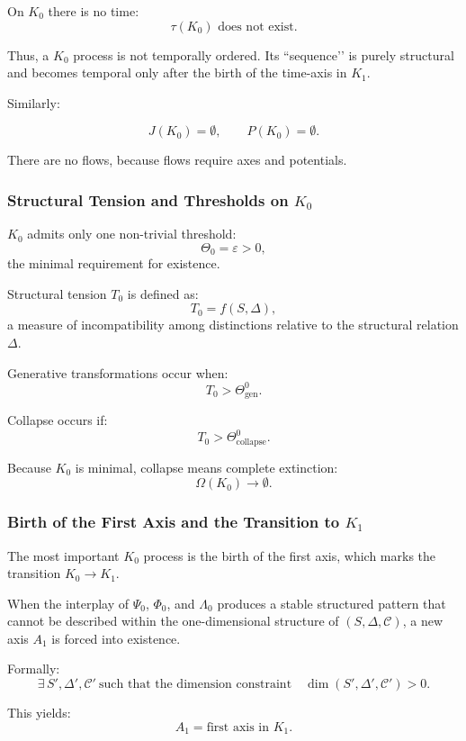 On $K_0$ there is no time:
\[
\tau(K_0) \text{ does not exist}.
\]

Thus, a $K_0$ process is not temporally ordered.  
Its ``sequence’’ is purely structural and becomes temporal only after the
birth of the time-axis in $K_1$.

Similarly:

\[
J(K_0) = \emptyset, \qquad P(K_0) = \emptyset.
\]

There are no flows, because flows require axes and potentials.

\subsubsection{Structural Tension and Thresholds on \texorpdfstring{$K_0$}{K_0}}

$K_0$ admits only one non-trivial threshold:
\[
\Theta_0 = \varepsilon > 0,
\]
the minimal requirement for existence.

Structural tension $T_0$ is defined as:
\[
T_0 = f(S,\Delta),
\]
a measure of incompatibility among distinctions relative to the structural
relation $\Delta$.

Generative transformations occur when:
\[
T_0 > \Theta^0_{\mathrm{gen}}.
\]

Collapse occurs if:
\[
T_0 > \Theta^0_{\mathrm{collapse}}.
\]

Because $K_0$ is minimal, collapse means complete extinction:
\[
\Omega(K_0) \to \emptyset.
\]

\subsubsection{Birth of the First Axis and the Transition to \texorpdfstring{$K_1$}{K_1}}

The most important $K_0$ process is the birth of the first axis, which
marks the transition $K_0 \to K_1$.

When the interplay of $\Psi_0$, $\Phi_0$, and $\Lambda_0$ produces a
stable structured pattern that cannot be described within the
one-dimensional structure of $(S, \Delta, \mathcal{C})$, a new axis $A_1$
is forced into existence.

Formally:
\[
\exists\, S', \Delta', \mathcal{C}'\ \text{such that the dimension constraint}
\quad
\dim(S',\Delta',\mathcal{C}') > 0.
\]

This yields:
\[
A_1 = \text{first axis in } K_1.
\]

